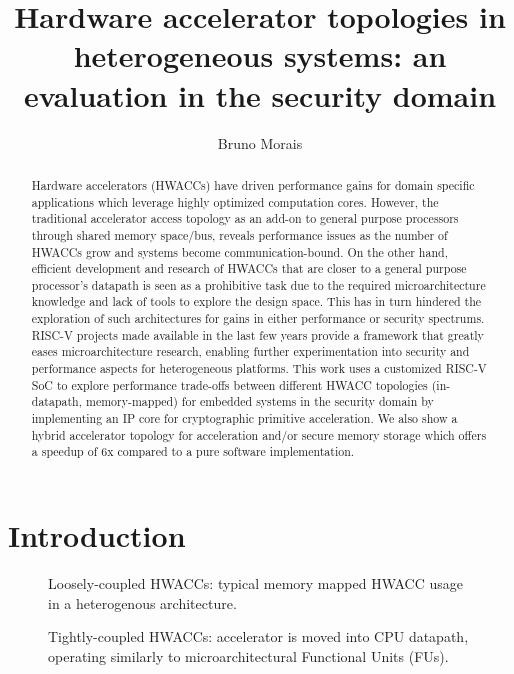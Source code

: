 \documentclass[10pt,conference]{IEEEtran}
\title{\textbf{Hardware accelerator topologies in heterogeneous systems: an evaluation in the
    security domain}}
\author{Bruno Morais}
\date{}
\begin{document}
\maketitle

\begin{abstract}
  Hardware accelerators (HWACCs) have driven performance gains for
  domain specific applications which leverage highly optimized computation
  cores. However, the traditional accelerator access topology as an add-on to
  general purpose processors through shared memory space/bus, reveals performance
  issues as the number of HWACCs grow and systems become
  communication-bound.
  On the other hand, efficient development and research of HWACCs
  that are closer to a general purpose processor's datapath is seen as a
  prohibitive task due to the required microarchitecture knowledge and lack of
  tools to explore the design space. This has in turn hindered the exploration of
  such architectures for gains in either performance or security spectrums.
  RISC-V projects made available in the last few years provide a framework that
  greatly eases microarchitecture research, enabling further experimentation
  into security and performance aspects for heterogeneous platforms.
  This work uses a customized RISC-V SoC to explore performance trade-offs
  between different HWACC topologies (in-datapath, memory-mapped) for embedded
  systems in the security domain by implementing an IP core for cryptographic
  primitive acceleration. We also show a hybrid accelerator topology for
  acceleration and/or secure memory storage which offers a speedup of 6x compared to a
  pure software implementation.

\end{abstract}

\section{Introduction}

\begin{figure}
  \centering
  
  \caption{Loosely-coupled HWACCs: typical memory mapped HWACC usage in a heterogenous architecture.}
\end{figure}

\begin{figure}
  \centering
  \caption{Tightly-coupled HWACCs: accelerator is moved into CPU datapath,
    operating similarly to microarchitectural Functional Units (FUs).}
\end{figure}
\end{document}
